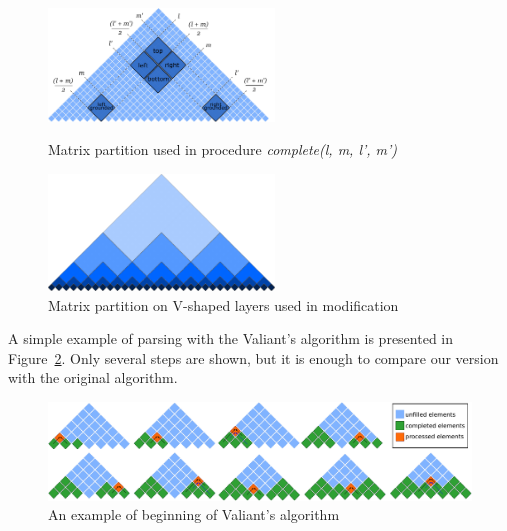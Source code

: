 \begin{figure}
\vspace{3mm}
 \begin{center}
    \begin{minipage}{0.48\textwidth}
        \centering
        \includegraphics[width=6cm]{pictures/splitting_with_grounded.pdf}
        \caption{Matrix partition used in procedure \textit{complete(l, m, l', m')}}
        \label{fig1}
    \end{minipage}\hfill
    \begin{minipage}{0.48\textwidth}
        \centering
        \includegraphics[width=6cm]{pictures/layers.pdf}
        \caption{Matrix partition on V-shaped layers used in modification}
        \label{fig2}
    \end{minipage}
 \end{center}
\vspace{-8mm}
\end{figure}

A simple example of parsing with the Valiant's algorithm is presented in Figure~\ref{fig3}.
Only several steps are shown, but it is enough to compare our version with the original algorithm.

\begin{figure}
\vspace{3mm}
 \begin{center}
 \includegraphics[width=12cm]{pictures/valbeg2.pdf}
    \caption{An example of beginning of Valiant's algorithm}
    \label{fig3}
\end{center}
\vspace{-8mm}
\end{figure}